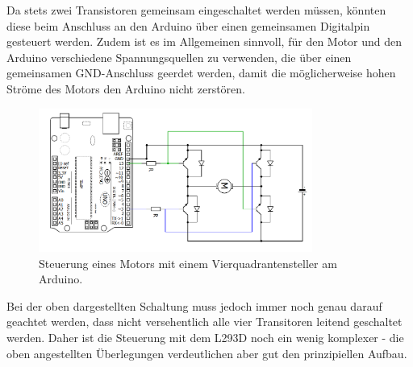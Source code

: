 Da stets zwei Transistoren gemeinsam eingeschaltet werden müssen, könnten diese beim Anschluss an den Arduino über einen gemeinsamen Digitalpin gesteuert werden. Zudem ist es im Allgemeinen sinnvoll, für den Motor und den Arduino verschiedene Spannungsquellen zu verwenden, die über einen gemeinsamen GND-Anschluss geerdet werden, damit die möglicherweise hohen Ströme des Motors den Arduino nicht zerstören.

\begin{figure}[H]
	\centering
	\includegraphics[width=0.8\textwidth]{./Zeichnungen/vierquadrantensteller-an-arduino.png}
	\caption{Steuerung eines Motors mit einem Vierquadrantensteller am Arduino.}
\end{figure}

Bei der oben dargestellten Schaltung muss jedoch immer noch genau darauf geachtet werden, dass nicht versehentlich alle vier Transitoren leitend geschaltet werden. Daher ist die Steuerung mit dem L293D noch ein wenig komplexer - die oben angestellten Überlegungen verdeutlichen aber gut den prinzipiellen Aufbau.

